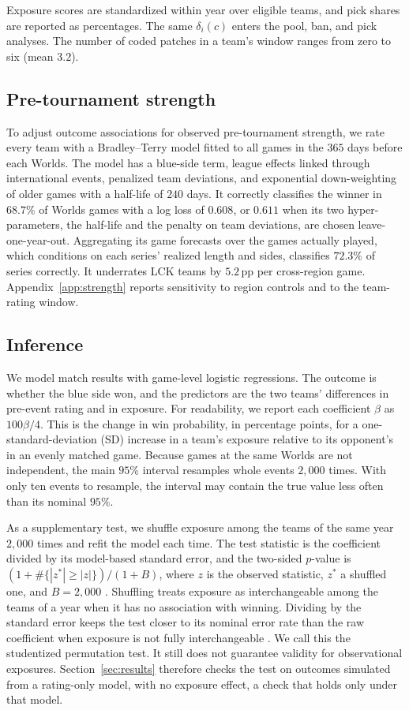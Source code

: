 \documentclass[11pt]{article}
\newcommand{\pp}{\,pp}
\begin{document}
Exposure scores are standardized within year over eligible teams, and pick shares are reported as percentages. The same $\delta_i(c)$ enters the pool, ban, and pick analyses. The number of coded patches in a team's window ranges from zero to six (mean $3.2$).

\subsection{Pre-tournament strength}
To adjust outcome associations for observed pre-tournament strength, we rate every team with a Bradley--Terry model \citep{bradley1952} fitted to all games in the $365$ days before each Worlds. The model has a blue-side term, league effects linked through international events, penalized team deviations, and exponential down-weighting of older games with a half-life of $240$ days. It correctly classifies the winner in $68.7\%$ of Worlds games with a log loss of $0.608$, or $0.611$ when its two hyper-parameters, the half-life and the penalty on team deviations, are chosen leave-one-year-out. Aggregating its game forecasts over the games actually played, which conditions on each series' realized length and sides, classifies $72.3\%$ of series correctly. It underrates LCK teams by $5.2$\pp{} per cross-region game. Appendix~\ref{app:strength} reports sensitivity to region controls and to the team-rating window.

\subsection{Inference}
We model match results with game-level logistic regressions. The outcome is whether the blue side won, and the predictors are the two teams' differences in pre-event rating and in exposure. For readability, we report each coefficient $\beta$ as $100\beta/4$. This is the change in win probability, in percentage points, for a one-standard-deviation (SD) increase in a team's exposure relative to its opponent's in an evenly matched game. Because games at the same Worlds are not independent, the main $95\%$ interval resamples whole events $2{,}000$ times. With only ten events to resample, the interval may contain the true value less often than its nominal $95\%$.

As a supplementary test, we shuffle exposure among the teams of the same year $2{,}000$ times and refit the model each time. The test statistic is the coefficient divided by its model-based standard error, and the two-sided $p$-value is $(1+\#\{|z^{*}|\geq|z|\})/(1+B)$, where $z$ is the observed statistic, $z^{*}$ a shuffled one, and $B = 2{,}000$ \citep{efron1993,good2005}. Shuffling treats exposure as interchangeable among the teams of a year when it has no association with winning. Dividing by the standard error keeps the test closer to its nominal error rate than the raw coefficient when exposure is not fully interchangeable \citep{chung2013}. We call this the studentized permutation test. It still does not guarantee validity for observational exposures. Section~\ref{sec:results} therefore checks the test on outcomes simulated from a rating-only model, with no exposure effect, a check that holds only under that model.
\end{document}
